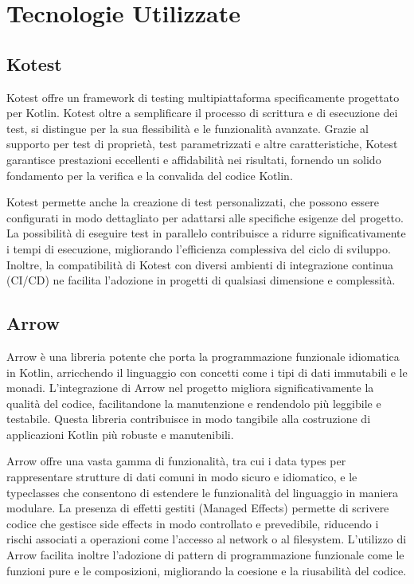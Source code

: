 \documentclass[12pt,a4paper,openright,twoside]{book}
\begin{document}
\section{Tecnologie Utilizzate}

\subsection{Kotest}
Kotest offre un framework di testing multipiattaforma specificamente progettato per Kotlin. Kotest oltre a semplificare il processo di scrittura e di esecuzione dei test, 
si distingue per la sua flessibilità e le funzionalità avanzate. Grazie al supporto per test di proprietà, test parametrizzati e altre caratteristiche, Kotest garantisce prestazioni 
eccellenti e affidabilità nei risultati, fornendo un solido fondamento per la verifica e la convalida del codice Kotlin.

Kotest permette anche la creazione di test personalizzati, che possono essere configurati in modo dettagliato per adattarsi alle specifiche esigenze del progetto. 
La possibilità di eseguire test in parallelo contribuisce a ridurre significativamente i tempi di esecuzione, migliorando l'efficienza complessiva del ciclo di sviluppo. 
Inoltre, la compatibilità di Kotest con diversi ambienti di integrazione continua (\ac{CI/CD}) ne facilita l'adozione in progetti di qualsiasi dimensione e complessità.

\subsection{Arrow}
Arrow è una libreria potente che porta la programmazione funzionale idiomatica in Kotlin, arricchendo il linguaggio con concetti come i tipi di dati immutabili e le monadi. 
L'integrazione di Arrow nel progetto migliora significativamente la qualità del codice, facilitandone la manutenzione e rendendolo più leggibile e testabile. 
Questa libreria contribuisce in modo tangibile alla costruzione di applicazioni Kotlin più robuste e manutenibili.

Arrow offre una vasta gamma di funzionalità, tra cui i data types per rappresentare strutture di dati comuni in modo sicuro e idiomatico, e le typeclasses che consentono di estendere 
le funzionalità del linguaggio in maniera modulare. La presenza di effetti gestiti (Managed Effects) permette di scrivere codice che gestisce side effects in modo controllato e 
prevedibile, riducendo i rischi associati a operazioni come l'accesso al network o al filesystem. L'utilizzo di Arrow facilita inoltre l'adozione di pattern di programmazione 
funzionale come le funzioni pure e le composizioni, migliorando la coesione e la riusabilità del codice.
\end{document}
